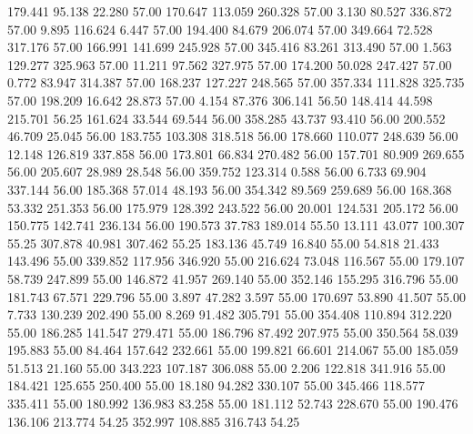  179.441   95.138   22.280        57.00
 170.647  113.059  260.328        57.00
   3.130   80.527  336.872        57.00
   9.895  116.624    6.447        57.00
 194.400   84.679  206.074        57.00
 349.664   72.528  317.176        57.00
 166.991  141.699  245.928        57.00
 345.416   83.261  313.490        57.00
   1.563  129.277  325.963        57.00
  11.211   97.562  327.975        57.00
 174.200   50.028  247.427        57.00
   0.772   83.947  314.387        57.00
 168.237  127.227  248.565        57.00
 357.334  111.828  325.735        57.00
 198.209   16.642   28.873        57.00
   4.154   87.376  306.141        56.50
 148.414   44.598  215.701        56.25
 161.624   33.544   69.544        56.00
 358.285   43.737   93.410        56.00
 200.552   46.709   25.045        56.00
 183.755  103.308  318.518        56.00
 178.660  110.077  248.639        56.00
  12.148  126.819  337.858        56.00
 173.801   66.834  270.482        56.00
 157.701   80.909  269.655        56.00
 205.607   28.989   28.548        56.00
 359.752  123.314    0.588        56.00
   6.733   69.904  337.144        56.00
 185.368   57.014   48.193        56.00
 354.342   89.569  259.689        56.00
 168.368   53.332  251.353        56.00
 175.979  128.392  243.522        56.00
  20.001  124.531  205.172        56.00
 150.775  142.741  236.134        56.00
 190.573   37.783  189.014        55.50
  13.111   43.077  100.307        55.25
 307.878   40.981  307.462        55.25
 183.136   45.749   16.840        55.00
  54.818   21.433  143.496        55.00
 339.852  117.956  346.920        55.00
 216.624   73.048  116.567        55.00
 179.107   58.739  247.899        55.00
 146.872   41.957  269.140        55.00
 352.146  155.295  316.796        55.00
 181.743   67.571  229.796        55.00
   3.897   47.282    3.597        55.00
 170.697   53.890   41.507        55.00
   7.733  130.239  202.490        55.00
   8.269   91.482  305.791        55.00
 354.408  110.894  312.220        55.00
 186.285  141.547  279.471        55.00
 186.796   87.492  207.975        55.00
 350.564   58.039  195.883        55.00
  84.464  157.642  232.661        55.00
 199.821   66.601  214.067        55.00
 185.059   51.513   21.160        55.00
 343.223  107.187  306.088        55.00
   2.206  122.818  341.916        55.00
 184.421  125.655  250.400        55.00
  18.180   94.282  330.107        55.00
 345.466  118.577  335.411        55.00
 180.992  136.983   83.258        55.00
 181.112   52.743  228.670        55.00
 190.476  136.106  213.774        54.25
 352.997  108.885  316.743        54.25
